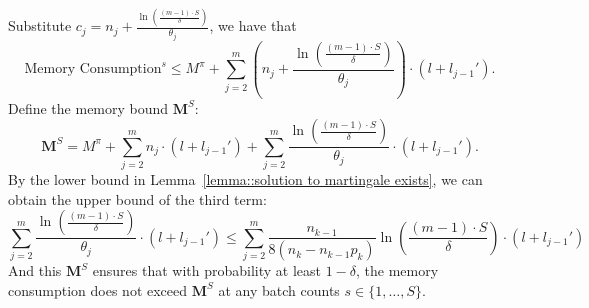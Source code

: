 \documentclass[preprint]{article}
\theoremstyle{plain}
\theoremstyle{definition}
\theoremstyle{remark}
\begin{document}
Substitute \(c_j = n_j + \frac{\ln\left( \frac{(m - 1) \cdot S}{\delta} \right)}{\theta_j} \), we have that
$$    \text{Memory Consumption}^s \leq M^{\pi} + \sum_{j=2}^m \left( n_j + \frac{\ln\left( \frac{(m - 1) \cdot S}{\delta} \right)}{\theta_j} \right) \cdot (l + l_{j-1}').$$
Define the memory bound \( \mathbf{M}^S \):
$$\mathbf{M}^S = M^{\pi} + \sum_{j=2}^m n_j \cdot (l + l_{j-1}') + \sum_{j=2}^m \frac{\ln\left( \frac{(m - 1) \cdot S}{\delta} \right)}{\theta_j} \cdot (l + l_{j-1}').$$
By the lower bound in Lemma~\ref{lemma::solution to martingale exists}, we can obtain the upper bound of the third term:
$$\sum_{j=2}^m \frac{\ln\left( \frac{(m - 1) \cdot S}{\delta} \right)}{\theta_j} \cdot (l + l_{j-1}') \leq \sum_{j=2}^m \frac{n_{k-1}}{8(n_k - n_{k-1}p_k)}\ln\left( \frac{(m - 1) \cdot S}{\delta} \right)\cdot (l + l_{j-1}')$$
And this \( \mathbf{M}^S \) ensures that with probability at least \( 1 - \delta \), the memory consumption does not exceed \( \mathbf{M}^S \) at any batch counts \( s \in \{1, \dots, S\} \).


\end{document}
